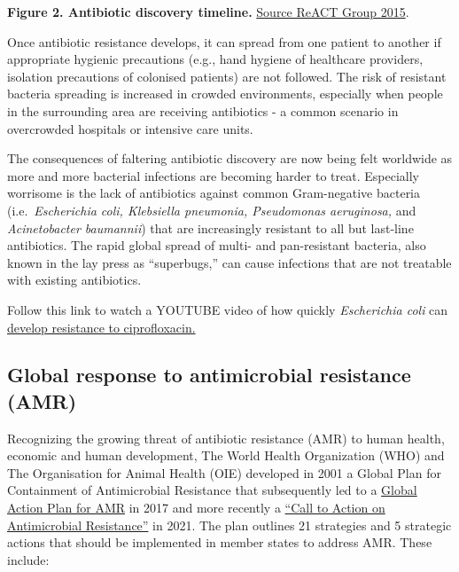 \documentclass[
  11pt,
  paper=a4,
  ,captions=tableheading
]{scrartcl}
\begin{document}
\textbf{Figure 2. Antibiotic discovery timeline.}
\href{https://www.reactgroup.org/}{Source ReACT Group 2015}.

Once antibiotic resistance develops, it can spread from one patient to
another if appropriate hygienic precautions (e.g., hand hygiene of
healthcare providers, isolation precautions of colonised patients) are
not followed. The risk of resistant bacteria spreading is increased in
crowded environments, especially when people in the surrounding area are
receiving antibiotics - a common scenario in overcrowded hospitals or
intensive care units.

The consequences of faltering antibiotic discovery are now being felt
worldwide as more and more bacterial infections are becoming harder to
treat. Especially worrisome is the lack of antibiotics against common
Gram-negative bacteria (i.e.~\emph{Escherichia coli, Klebsiella
pneumonia, Pseudomonas aeruginosa,} and \emph{Acinetobacter baumannii})
that are increasingly resistant to all but last-line antibiotics. The
rapid global spread of multi- and pan-resistant bacteria, also known in
the lay press as ``superbugs,'' can cause infections that are not
treatable with existing antibiotics.

Follow this link to watch a YOUTUBE video of how quickly
\emph{Escherichia coli} can
\href{https://www.youtube.com/watch?v=bDa4-nSc7J8}{develop resistance to
ciprofloxacin.}

\hypertarget{global-response-to-antimicrobial-resistance-amr}{%
\subsection*{Global response to antimicrobial resistance
(AMR)}\label{global-response-to-antimicrobial-resistance-amr}}

Recognizing the growing threat of antibiotic resistance (AMR) to human
health, economic and human development, The World Health Organization
(WHO) and The Organisation for Animal Health (OIE) developed in 2001 a
Global Plan for Containment of Antimicrobial Resistance that
subsequently led to a
\href{https://www.who.int/publications/i/item/9789241509763}{Global
Action Plan for AMR} in 2017 and more recently a
\href{https://www.who.int/news/item/30-07-2021-call-to-action-on-antimicrobial-resistance-2021}{``Call
to Action on Antimicrobial Resistance''} in 2021. The plan outlines 21
strategies and 5 strategic actions that should be implemented in member
states to address AMR. These include:
\end{document}

